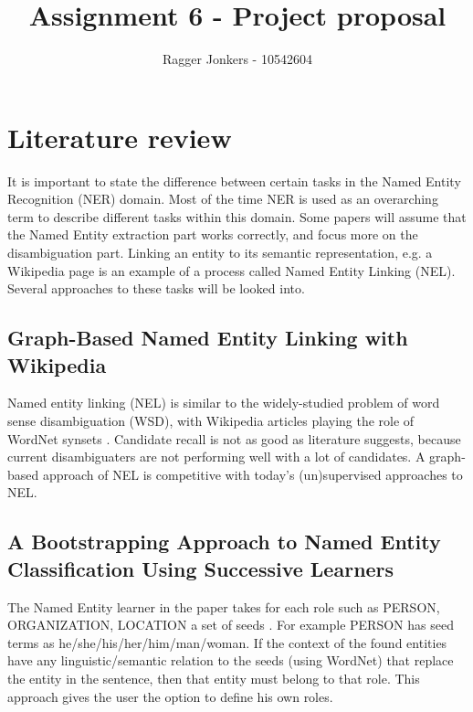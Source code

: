 \documentclass{article}
\title{Assignment 6 - Project proposal}
\author{Ragger Jonkers - 10542604}
\begin{document}
\maketitle

\section{Literature review}
It is important to state the difference between certain tasks in the Named Entity Recognition (NER) domain. Most of the time NER is used as an overarching term to describe different tasks within this domain. Some papers will assume that the Named Entity extraction part works correctly, and focus more on the disambiguation part. Linking an entity to its semantic representation, e.g. a Wikipedia page \cite{hachey2011graph} is an example of a process called Named Entity Linking (NEL). Several approaches to these tasks will be looked into.


\subsection*{Graph-Based Named Entity Linking with Wikipedia}
Named entity linking (NEL) is similar to the widely-studied problem of word sense disambiguation (WSD), with Wikipedia articles playing the role of WordNet synsets \cite{hachey2011graph}. Candidate recall is not as good as literature suggests, because current disambiguaters are not performing well with a lot of candidates. A graph-based approach of NEL is competitive with today's (un)supervised approaches to NEL.

\subsection*{A Bootstrapping Approach to Named Entity Classification Using Successive Learners}
The Named Entity learner in the paper takes for each role such as PERSON, ORGANIZATION, LOCATION a set of seeds \cite{niu2003bootstrapping}. For example PERSON has seed terms as he/she/his/her/him/man/woman. If the context of the found entities have any linguistic/semantic relation to the seeds (using WordNet) that replace the entity in the sentence, then that entity must belong to that role. This approach gives the user the option to define his own roles.
\end{document}
